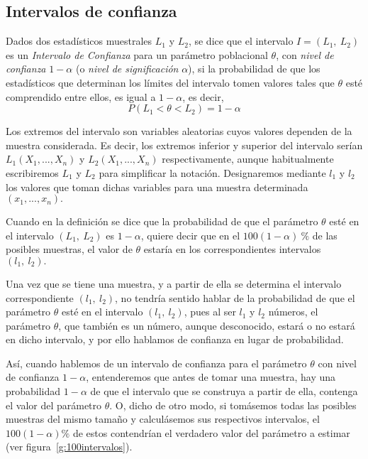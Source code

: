 \subsection{Intervalos de confianza}
Dados dos estadísticos muestrales $L_1$ y $L_2$, se dice que el intervalo $I=(L_1,\ L_2)$ es un \emph{Intervalo de
Confianza} para un parámetro poblacional $\theta$, con \emph{nivel de confianza} $1-\alpha$ (o \emph{nivel de
significación} $\alpha $), si la probabilidad de que los estadísticos que determinan los límites del intervalo tomen
valores tales que $\theta$ esté comprendido entre ellos, es igual a $1-\alpha$, es decir, \[ P\left( L_{1}<\theta
<L_{2}\right) =1-\alpha \]

Los extremos del intervalo son variables aleatorias cuyos valores dependen de la muestra considerada. Es decir, los
extremos inferior y superior del intervalo serían $L_{1}\left( X_{1},...,X_{n}\right) $ y $L_{2}\left(
X_{1},...,X_{n}\right)$ respectivamente, aunque habitualmente escribiremos $L_{1}$ y $L_{2}$ para simplificar la
notación. Designaremos mediante $l_{1}$ y $l_{2}$ los valores que toman dichas variables para una muestra determinada
$\left( x_{1},...,x_{n}\right).$

Cuando en la definición se dice que la probabilidad de que el parámetro $\theta $ esté en el intervalo $\left( L_{1},\
L_{2}\right) $ es $1-\alpha $, quiere decir que en el $100 \left( 1-\alpha \right) \ \% $ de las posibles muestras, el
valor de $\theta $ estaría en los correspondientes intervalos $\left( l_{1},\ l_{2}\right) .$

Una vez que se tiene una muestra, y a partir de ella se determina el intervalo correspondiente $\left( l_{1},\
l_{2}\right) $, no tendría sentido hablar de la probabilidad de que el parámetro $\theta $ esté en el intervalo $\left(
l_{1},\ l_{2}\right) $, pues al ser $l_{1}$ y $l_{2}$ números, el parámetro $\theta $, que también es un número, aunque
desconocido, estará o no estará en dicho intervalo, y por ello hablamos de confianza en lugar de probabilidad.

Así, cuando hablemos de un intervalo de confianza para el parámetro $\theta $ con nivel de confianza $1-\alpha $,
entenderemos que antes de tomar una muestra, hay una probabilidad $1-\alpha $ de que el intervalo que se construya a
partir de ella, contenga el valor del parámetro $\theta$. O, dicho de otro modo, si tomásemos todas las posibles muestras del mismo
tamaño y calculásemos sus respectivos intervalos, el $100(1-\alpha)\% $ de estos contendrían el verdadero valor del parámetro a
estimar (ver figura~\ref{g:100intervalos}).

